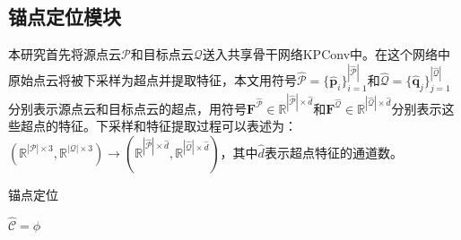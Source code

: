     \subsection{锚点定位模块}
    本研究首先将源点云$\mathcal{P}$和目标点云$\mathcal{Q}$送入共享骨干网络KPConv中。在这个网络中原始点云将被下采样为超点并提取特征，本文用符号$\mathcal{\hat{P}} = \{\mathbf{\hat{p}}_i\}_{i=1}^{|\mathcal{\hat{P}}| }$和$\mathcal{\hat{Q}} = \{\mathbf{\hat{q}}_j\}_{j=1}^{|\mathcal{\hat{Q}}| }$分别表示源点云和目标点云的超点，用符号$\mathbf{F}^{\hat{\mathcal{P}}} \in \mathbb{R}^{\left|\mathcal{\hat{P}}\right| \times \hat{d}}$和$\mathbf{F}^{\hat{\mathcal{Q}}} \in \mathbb{R}^{\left|\mathcal{\hat{Q}}\right| \times \hat{d}}$分别表示这些超点的特征。下采样和特征提取过程可以表述为：
    $\left(\mathbb{R}^{\left|\mathcal{P}\right|\times 3},
    \mathbb{R}^{\left|\mathcal{Q}\right|\times 3}\right) 
    \rightarrow 
    \left(\mathbb{R}^{\left|\hat{\mathcal{P}}\right| \times \hat{d}}, 
    \mathbb{R}^{\left|\hat{\mathcal{Q}}\right| \times \hat{d}}\right)$，其中$ \hat{d}$表示超点特征的通道数。\par

    \vspace{-0.1cm}
    \begin{algorithm}[h]
        \caption{锚点定位}
        \label{alg:anchor_location}
        \LinesNumbered 
    
        $\mathcal{\hat{C}} = \phi$ \\
    \end{algorithm}
    \vspace{-0.35cm}

